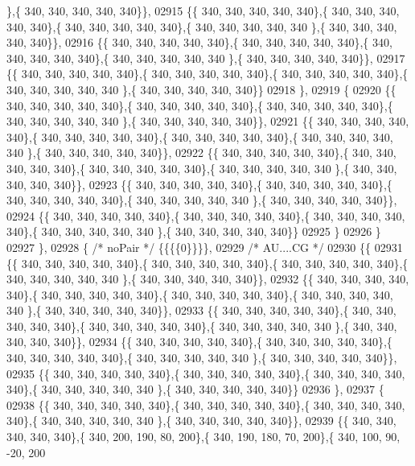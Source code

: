 \begin{DoxyCode}
      \},\{ 340, 340, 340, 340, 340\}\},
02915 \{\{ 340, 340, 340, 340, 340\},\{ 340, 340, 340, 340, 340\},\{ 340, 340, 340, 340, 340\},\{ 340, 340, 340, 340, 340
      \},\{ 340, 340, 340, 340, 340\}\},
02916 \{\{ 340, 340, 340, 340, 340\},\{ 340, 340, 340, 340, 340\},\{ 340, 340, 340, 340, 340\},\{ 340, 340, 340, 340, 340
      \},\{ 340, 340, 340, 340, 340\}\},
02917 \{\{ 340, 340, 340, 340, 340\},\{ 340, 340, 340, 340, 340\},\{ 340, 340, 340, 340, 340\},\{ 340, 340, 340, 340, 340
      \},\{ 340, 340, 340, 340, 340\}\}
02918 \},
02919 \{
02920 \{\{ 340, 340, 340, 340, 340\},\{ 340, 340, 340, 340, 340\},\{ 340, 340, 340, 340, 340\},\{ 340, 340, 340, 340, 340
      \},\{ 340, 340, 340, 340, 340\}\},
02921 \{\{ 340, 340, 340, 340, 340\},\{ 340, 340, 340, 340, 340\},\{ 340, 340, 340, 340, 340\},\{ 340, 340, 340, 340, 340
      \},\{ 340, 340, 340, 340, 340\}\},
02922 \{\{ 340, 340, 340, 340, 340\},\{ 340, 340, 340, 340, 340\},\{ 340, 340, 340, 340, 340\},\{ 340, 340, 340, 340, 340
      \},\{ 340, 340, 340, 340, 340\}\},
02923 \{\{ 340, 340, 340, 340, 340\},\{ 340, 340, 340, 340, 340\},\{ 340, 340, 340, 340, 340\},\{ 340, 340, 340, 340, 340
      \},\{ 340, 340, 340, 340, 340\}\},
02924 \{\{ 340, 340, 340, 340, 340\},\{ 340, 340, 340, 340, 340\},\{ 340, 340, 340, 340, 340\},\{ 340, 340, 340, 340, 340
      \},\{ 340, 340, 340, 340, 340\}\}
02925 \}
02926 \}
02927 \},
02928 \{ \textcolor{comment}{/* noPair */} \{\{\{\{0\}\}\}\},
02929 \textcolor{comment}{/* AU....CG */}
02930 \{\{
02931 \{\{ 340, 340, 340, 340, 340\},\{ 340, 340, 340, 340, 340\},\{ 340, 340, 340, 340, 340\},\{ 340, 340, 340, 340, 340
      \},\{ 340, 340, 340, 340, 340\}\},
02932 \{\{ 340, 340, 340, 340, 340\},\{ 340, 340, 340, 340, 340\},\{ 340, 340, 340, 340, 340\},\{ 340, 340, 340, 340, 340
      \},\{ 340, 340, 340, 340, 340\}\},
02933 \{\{ 340, 340, 340, 340, 340\},\{ 340, 340, 340, 340, 340\},\{ 340, 340, 340, 340, 340\},\{ 340, 340, 340, 340, 340
      \},\{ 340, 340, 340, 340, 340\}\},
02934 \{\{ 340, 340, 340, 340, 340\},\{ 340, 340, 340, 340, 340\},\{ 340, 340, 340, 340, 340\},\{ 340, 340, 340, 340, 340
      \},\{ 340, 340, 340, 340, 340\}\},
02935 \{\{ 340, 340, 340, 340, 340\},\{ 340, 340, 340, 340, 340\},\{ 340, 340, 340, 340, 340\},\{ 340, 340, 340, 340, 340
      \},\{ 340, 340, 340, 340, 340\}\}
02936 \},
02937 \{
02938 \{\{ 340, 340, 340, 340, 340\},\{ 340, 340, 340, 340, 340\},\{ 340, 340, 340, 340, 340\},\{ 340, 340, 340, 340, 340
      \},\{ 340, 340, 340, 340, 340\}\},
02939 \{\{ 340, 340, 340, 340, 340\},\{ 340, 200, 190,  80, 200\},\{ 340, 190, 180,  70, 200\},\{ 340, 100,  90, -20, 200

\end{DoxyCode}
